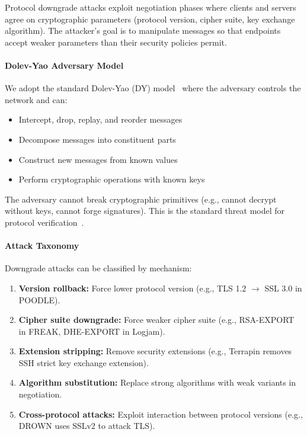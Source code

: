 \documentclass[10pt,twocolumn]{article}
\begin{document}
Protocol downgrade attacks exploit negotiation phases where clients and servers agree on cryptographic parameters (protocol version, cipher suite, key exchange algorithm). The attacker's goal is to manipulate messages so that endpoints accept weaker parameters than their security policies permit.

\paragraph{Dolev-Yao Adversary Model}
We adopt the standard Dolev-Yao (DY) model~\cite{dolev1983security} where the adversary controls the network and can:
\begin{itemize}[leftmargin=*,noitemsep]
\item Intercept, drop, replay, and reorder messages
\item Decompose messages into constituent parts
\item Construct new messages from known values
\item Perform cryptographic operations with known keys
\end{itemize}
The adversary cannot break cryptographic primitives (e.g., cannot decrypt without keys, cannot forge signatures). This is the standard threat model for protocol verification~\cite{blanchet2016modeling,meier2013tamarin}.

\paragraph{Attack Taxonomy}
Downgrade attacks can be classified by mechanism:

\begin{enumerate}[leftmargin=*,noitemsep]
\item \textbf{Version rollback:} Force lower protocol version (e.g., TLS 1.2 $\rightarrow$ SSL 3.0 in POODLE).
\item \textbf{Cipher suite downgrade:} Force weaker cipher suite (e.g., RSA-EXPORT in FREAK, DHE-EXPORT in Logjam).
\item \textbf{Extension stripping:} Remove security extensions (e.g., Terrapin removes SSH strict key exchange extension).
\item \textbf{Algorithm substitution:} Replace strong algorithms with weak variants in negotiation.
\item \textbf{Cross-protocol attacks:} Exploit interaction between protocol versions (e.g., DROWN uses SSLv2 to attack TLS).
\end{enumerate}
\end{document}
